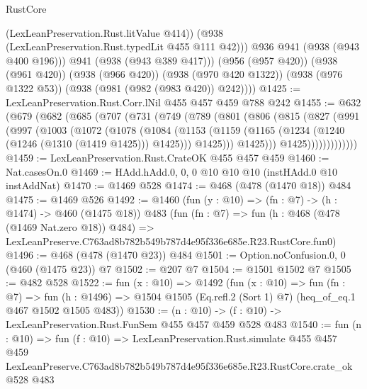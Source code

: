 \begin{lexlean}{RustCore}
\begin{coremodule}
                (LexLeanPreservation.Rust.litValue @414))
              (@938 (LexLeanPreservation.Rust.typedLit @455 @111 @42)))
            @936
            @941
            (@938 (@943 @400 @196)))
          @941
          (@938 (@943 @389 @417)))
        (@956 (@957 @420))
        (@938 (@961 @420))
        (@938 (@966 @420))
        (@938 (@970 @420 @1322))
        (@938 (@976 @1322 @53))
        (@938 (@981 (@982 (@983 @420)) @242))))
@1425 := LexLeanPreservation.Rust.Corr.lNil @455 @457 @459 @788 @242
@1455 := @632
    (@679
      (@682
        (@685
          (@707
            (@731
              (@749
                (@789
                  (@801
                    (@806
                      (@815
                        (@827
                          (@991
                            (@997
                              (@1003
                                (@1072
                                  (@1078
                                    (@1084
                                      (@1153
                                        (@1159
                                          (@1165
                                            (@1234 (@1240 (@1246 (@1310 (@1419 @1425))) @1425)))
                                          @1425)))
                                    @1425)))
                              @1425)))))))))))))
@1459 := LexLeanPreservation.Rust.CrateOK @455 @457 @459
@1460 := Nat.casesOn.{0}
@1469 := HAdd.hAdd.{0, 0, 0} @10 @10 @10 (instHAdd.{0} @10 instAddNat)
@1470 := @1469 @528
@1474 := @468 (@478 (@1470 @18)) @484
@1475 := @1469 @526
@1492 := @1460
    (fun (y : @10) => (fn : @7) -> (h : @1474) -> @460 (@1475 @18))
    @483
    (fun (fn : @7) =>
    fun (h : @468 (@478 (@1469 Nat.zero @18)) @484) =>
    LexLeanPreserve.C763ad8b782b549b787d4e95f336e685e.R23.RustCore.fun0)
@1496 := @468 (@478 (@1470 @23)) @484
@1501 := Option.noConfusion.{0, 0} (@460 (@1475 @23)) @7
@1502 := @207 @7
@1504 := @1501 @1502 @7
@1505 := @482 @528
@1522 := fun (x : @10) =>
  @1492
    (fun (x : @10) =>
    fun (fn : @7) =>
    fun (h : @1496) => @1504 @1505 (Eq.refl.{2} (Sort 1) @7) (heq_of_eq.{1} @467 @1502 @1505 @483))
@1530 := (n : @10) -> (f : @10) -> LexLeanPreservation.Rust.FunSem @455 @457 @459 @528 @483
@1540 := fun (n : @10) =>
  fun (f : @10) =>
  LexLeanPreservation.Rust.simulate
    @455
    @457
    @459
    LexLeanPreserve.C763ad8b782b549b787d4e95f336e685e.R23.RustCore.crate_ok
    @528
    @483
\end{coremodule}
\end{lexlean}
